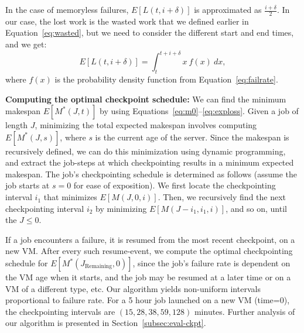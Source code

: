 In the case of memoryless failures, $E[L(t, i+\delta)]$ is approximated as $\frac{i+\delta}{2}$.
In our case, the lost work is the wasted work that we defined earlier in Equation~\ref{eq:wasted}, but we need to consider the different start and end times, and we get:
\begin{equation}
  \label{eq:exploss}
E[L(t, i+\delta)] = \int_{t}^{t+i+\delta}{x~f(x)~dx}   , 
\end{equation}
where $f(x)$ is the probability density function from Equation~\ref{eq:failrate}.

\noindent \textbf{Computing the optimal checkpoint schedule:} We can find the minimum makespan $E[M^*(J, t)]$ by using Equations~\ref{eq:m0}--\ref{eq:exploss}. 
Given a job of length $J$, minimizing the total expected makespan involves computing $E[M^*(J, s)]$, where $s$ is the current age of the server. 
Since the makespan is recursively defined, we can do this minimization using dynamic programming, and extract the job-steps at which checkpointing results in a minimum expected makespan. 
The job's checkpointing schedule is determined as follows (assume the job starts at $s=0$ for ease of exposition). 
We first locate the checkpointing interval $i_1$ that minimizes $E[M(J,0,i)]$.  
Then, we recursively find the next checkpointing interval $i_2$ by minimizing  $E[M(J-i_1, i_1,i)]$, and so on, until the $J\leq0$. %

If a job encounters a failure, it is resumed from the most recent checkpoint, on a new VM.
After every such resume-event, we compute the optimal checkpointing schedule for $E[M^*(J_{\text{Remaining}}, 0)]$, since the job's failure rate is dependent on the VM age when it starts, and the job may be resumed at a later time or on a VM of a different type, etc.
Our algorithm yields non-uniform intervals proportional to failure rate.
For a 5 hour job launched on a new VM (time=0), the checkpointing intervals are $(15, 28, 38, 59, 128)$ minutes.
Further analysis of our algorithm is presented in Section~\ref{subsec:eval-ckpt}. 



